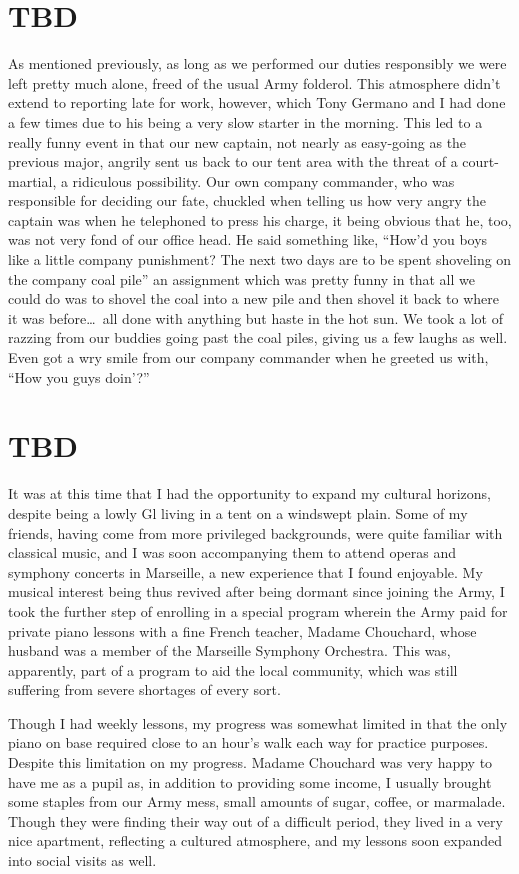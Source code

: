 \documentclass[../m3y]{subfiles}
\begin{document}
\section{TBD}
As mentioned previously, as long as we performed our duties responsibly we were left pretty much alone, freed of the usual Army folderol. This atmosphere didn't extend to reporting late for work, however, which Tony Germano and I had done a few times due to his being a very slow starter in the morning. This led to a really funny event in that our new captain, not nearly as easy-going as the previous major, angrily sent us back to our tent area with the threat of a court-martial, a ridiculous possibility. Our own company commander, who was responsible for deciding our fate, chuckled when telling us how very angry the captain was when he telephoned to press his charge, it being obvious that he, too, was not very fond of our office head. He said something like, ``How'd you boys like a little company punishment? The next two days are to be spent shoveling on the company coal pile'' an assignment which was pretty funny in that all we could do was to shovel the coal into a new pile and then shovel it back to where it was before\ldots\ all done with anything but haste in the hot sun. We took a lot of razzing from our buddies going past the coal piles, giving us a few laughs as well. Even got a wry smile from our company commander when he greeted us with, ``How you guys doin'?''

\section{TBD}
It was at this time that I had the opportunity to expand my cultural horizons, despite being a lowly Gl living in a tent on a windswept plain. Some of my friends, having come from more privileged backgrounds, were quite familiar with classical music, and I was soon accompanying them to attend operas and symphony concerts in Marseille, a new experience that I found enjoyable. My musical interest being thus revived after being dormant since joining the Army, I took the further step of enrolling in a special program wherein the Army paid for private piano lessons with a fine French teacher, Madame Chouchard, whose husband was a member of the Marseille Symphony Orchestra. This was, apparently, part of a program to aid the local community, which was still suffering from severe shortages of every sort.

Though I had weekly lessons, my progress was somewhat limited in that the only piano on base required close to an hour's walk each way for practice purposes. Despite this limitation on my progress. Madame Chouchard was very happy to have me as a pupil as, in addition to providing some income, I usually brought some staples from our Army mess, small amounts of sugar, coffee, or marmalade. Though they were finding their way out of a difficult period, they lived in a very nice apartment, reflecting a cultured atmosphere, and my lessons soon expanded into social visits as well.
\end{document}

